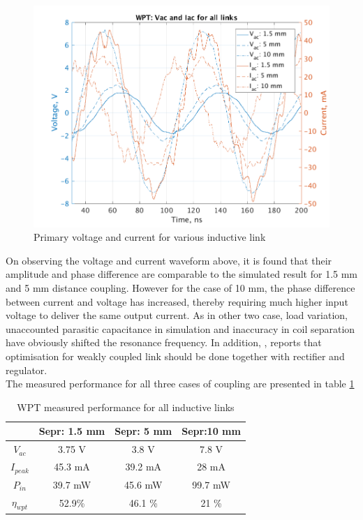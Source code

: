 \documentclass[12pt,a4paper,UKenglish]{report}
\begin{document}
 \begin{figure} [!htbp]
  \centering
  \includegraphics[width=\textwidth]{img/meas/wpt_all_pri_VI.pdf} 
 \caption{Primary voltage and current for various inductive link} 
\label{fig:meas_wpt_all_pri} 
\end{figure}

On observing the voltage and current waveform above, it is found that their amplitude and phase difference are comparable to the simulated result for 1.5 mm and 5 mm distance coupling. However for the case of 10 mm, the phase difference between current and voltage has increased, thereby requiring much higher input voltage to deliver the same output current. As in other two case, load variation, unaccounted parasitic capacitance in simulation and inaccuracy in coil separation have obviously shifted the resonance frequency. In addition, \cite{koen_robert_2009}, reports that optimisation for weakly coupled link should be done together with rectifier and regulator. \\

The measured performance for all three cases of coupling are presented in table \ref{tab:wpt_spec_all_meas}
 
 \begin{table}[H]
\caption{WPT measured performance for all inductive links} 
\begin{center}
\begin{tabular}{c|c|c|c}
\hline \hline
				& \textbf{Sepr: 1.5 mm}	& \textbf{Sepr: 5 mm} 	& \textbf{Sepr:10 mm} \\ \hline \hline
$V_{ac}$			& 3.75 \si{\volt}			& 3.8 \si{\volt} 			& 7.8 \si{\volt}	\\ \hline
$I_{peak}$		& 45.3 \si{\milli\ampere}		& 39.2 \si{\milli\ampere} 	& 28 \si{\milli\ampere} \\ \hline
$P_{in}$			& 39.7 \si{\milli\watt}		& 45.6 \si{\milli\watt} 		& 99.7 \si{\milli\watt} \\ \hline
$\eta_{wpt}$		&  52.9\%				& 46.1 \%				& 21 \% \\ 
 
\hline \hline
\end{tabular}
\end{center}
\label{tab:wpt_spec_all_meas}
\end{table}%
\end{document}
